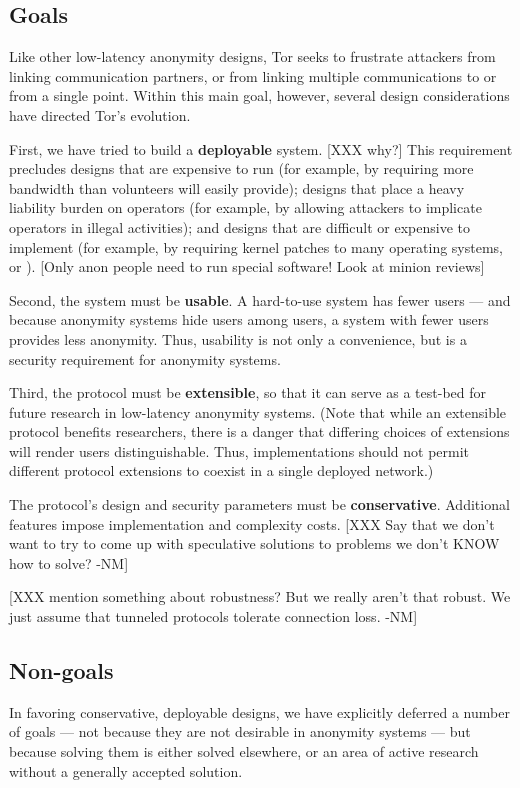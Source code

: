 \documentclass[times,10pt,twocolumn]{article}
\begin{document}
\label{sec:assumptions}


\subsection{Goals}
Like other low-latency anonymity designs, Tor seeks to frustrate
attackers from linking communication partners, or from linking
multiple communications to or from a single point.  Within this
main goal, however, several design considerations have directed
Tor's evolution.

First, we have tried to build a {\bf deployable} system.  [XXX why?]
This requirement precludes designs that are expensive to run (for
example, by requiring more bandwidth than volunteers will easily
provide); designs that place a heavy liability burden on operators
(for example, by allowing attackers to implicate operators in illegal
activities); and designs that are difficult or expensive to implement
(for example, by requiring kernel patches to many operating systems,
or ).  [Only anon people need to run special software!  Look at minion
reviews]  

Second, the system must be {\bf usable}.  A hard-to-use system has
fewer users --- and because anonymity systems hide users among users, a
system with fewer users provides less anonymity.  Thus, usability is
not only a convenience, but is a security requirement for anonymity
systems.

Third, the protocol must be {\bf extensible}, so that it can serve as
a test-bed for future research in low-latency anonymity systems.
(Note that while an extensible protocol benefits researchers, there is
a danger that differing choices of extensions will render users
distinguishable.  Thus, implementations should not permit different
protocol extensions to coexist in a single deployed network.)

The protocol's design and security parameters must be {\bf
conservative}.  Additional features impose implementation and
complexity costs. [XXX Say that we don't want to try to come up with
speculative solutions to problems we don't KNOW how to solve? -NM]

[XXX mention something about robustness?  But we really aren't that
  robust.  We just assume that tunneled protocols tolerate connection
  loss. -NM]

\subsection{Non-goals}
In favoring conservative, deployable designs, we have explicitly
deferred a number of goals --- not because they are not desirable in
anonymity systems --- but because solving them is either solved
elsewhere, or an area of active research without a generally accepted
solution.
\end{document}
